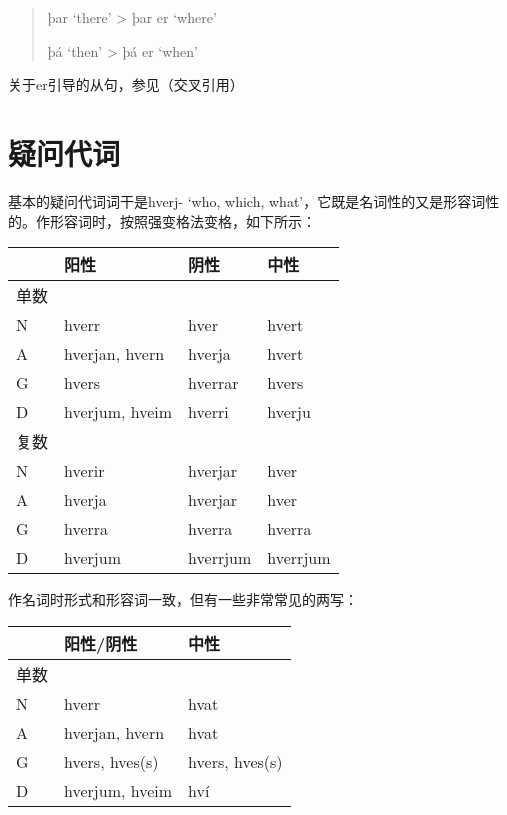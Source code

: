 \begin{quote}
  þar `there‌' \textgreater{} þar er `where‌'

  þá `then‌' \textgreater{} þá er `when‌'
\end{quote}

关于er引导的从句，参见（交叉引用）

\section{疑问代词}\label{疑问代词}

基本的疑问代词词干是hverj- `who, which,
what‌'，它既是名词性的又是形容词性的。作形容词时，按照强变格法变格，如下所示：

\begin{longtable}{llll}
  \toprule
       & 阳性           & 阴性     & 中性     \\
  \midrule
  \endhead
  \bottomrule
  \endfoot
  单数 &                &          &          \\
  N    & hverr          & hver     & hvert    \\
  A    & hverjan, hvern & hverja   & hvert    \\
  G    & hvers          & hverrar  & hvers    \\
  D    & hverjum, hveim & hverri   & hverju   \\
  复数 &                &          &          \\
  N    & hverir         & hverjar  & hver     \\
  A    & hverja         & hverjar  & hver     \\
  G    & hverra         & hverra   & hverra   \\
  D    & hverjum        & hverrjum & hverrjum \\
\end{longtable}

作名词时形式和形容词一致，但有一些非常常见的两写：

\begin{longtable}{lll}
  \toprule
       & 阳性/阴性      & 中性           \\
  \midrule
  \endhead
  \bottomrule
  \endfoot
  单数 &                &                \\
  N    & hverr          & hvat           \\
  A    & hverjan, hvern & hvat           \\
  G    & hvers, hves(s) & hvers, hves(s) \\
  D    & hverjum, hveim & hví            \\
\end{longtable}

